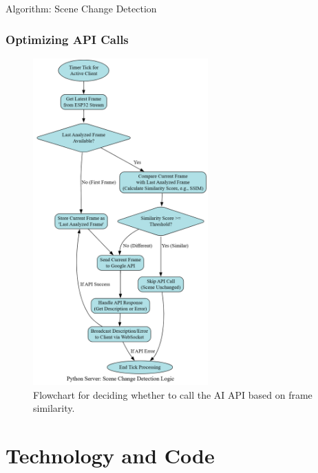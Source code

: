 \documentclass{beamer}
\begin{document}
\begin{frame}{Algorithm: Scene Change Detection}
    \frametitle{Optimizing API Calls}
     \begin{figure}
        \centering
        \includegraphics[height=0.8\textheight, width=0.6\textwidth, keepaspectratio]{Scene_Change_Detection_Logic_Flowchart.png} %
        \caption{Flowchart for deciding whether to call the AI API based on frame similarity.}
    \end{figure}
\end{frame}

\section{Technology and Code}
\end{document}
